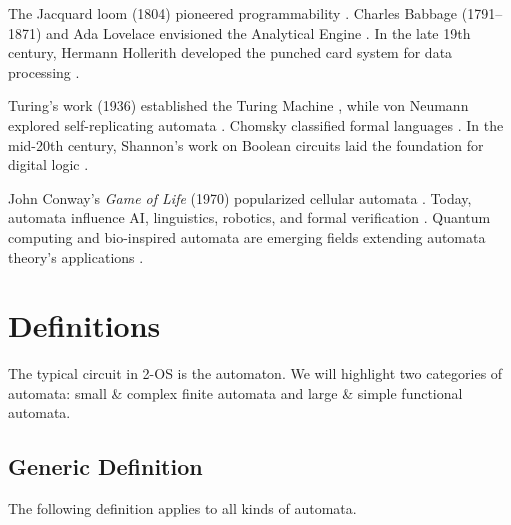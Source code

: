 The Jacquard loom (1804) pioneered programmability \cite{essinger2004jacquard}. Charles Babbage (1791–1871) and Ada Lovelace envisioned the Analytical Engine \cite{menabrea1842sketch}. In the late 19th century, Hermann Hollerith developed the punched card system for data processing \cite{hollerith1890tabulating}.

Turing's work (1936) established the Turing Machine \cite{turing1936computable}, while von Neumann explored self-replicating automata \cite{von1951general}. Chomsky classified formal languages \cite{Chomsky56}. In the mid-20th century, Shannon's work on Boolean circuits laid the foundation for digital logic \cite{shannon48}.

John Conway’s \textit{Game of Life} (1970) popularized cellular automata \cite{gardner1970mathematical}. Today, automata influence AI, linguistics, robotics, and formal verification \cite{hopcroft2006automata}. Quantum computing and bio-inspired automata are emerging fields extending automata theory’s applications \cite{nielsen2010quantum}.

\section{Definitions}

The typical circuit in 2-OS is the automaton. We will highlight two categories of automata: small \& complex finite automata and large \& simple functional automata.

\subsection{Generic Definition}
The following definition applies to all kinds of automata.

